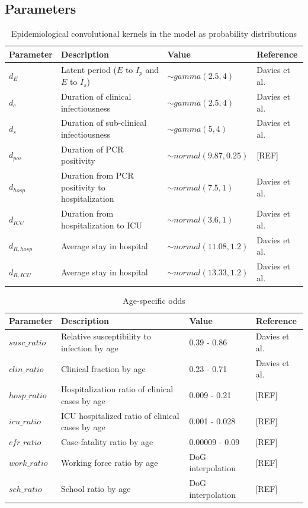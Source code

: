 \documentclass[12pt]{article}
\begin{document}
\newpage 
\subsection{Parameters}

\begin{center}
    \begin{table}[h]
    \caption{Epidemiological convolutional kernels in the model as probability distributions}
    \centering
\begin{tabular}[H]{p{2cm}p{6cm}p{4cm}p{3cm}}
     \textbf{Parameter}& \textbf{Description}  & \textbf{Value}& \textbf{Reference} \\
     \midrule
     $d_E$ & Latent period ($E$ to $I_p$ and $E$ to $I_s$) & $\sim gamma(2.5,4)$ & Davies et al.\\
     $d_c$ & Duration of clinical infectiousness& $\sim gamma(2.5,4)$ &  Davies et al.\\
     $d_s$ & Duration of sub-clinical infectiousness& $\sim gamma(5,4)$ &  Davies et al.\\
     $d_{pos}$ & Duration of PCR positivity& $\sim normal(9.87, 0.25)$ & [REF]\\ 
     $d_{hosp}$ & Duration from PCR positivity to hospitalization& $\sim normal(7.5, 1)$ & Davies et al.\\ 
     $d_{ICU}$ & Duration from hospitalization to ICU& $\sim normal(3.6, 1)$ & Davies et al.\\ 
     $d_{R,hosp}$ & Average stay in hospital & $\sim normal(11.08, 1.2)$ & Davies et al.\\ 
     $d_{R,ICU}$ & Average stay in hospital & $\sim normal(13.33, 1.2)$ & Davies et al.
    \end{tabular}
\end{table}
\end{center}

\begin{center}
    \begin{table}[h]
    \caption{Age-specific odds}
    \centering
\begin{tabular}[H]{p{3cm}p{5cm}p{4cm}p{3cm}}
     \textbf{Parameter}& \textbf{Description}  & \textbf{Value}& \textbf{Reference} \\
     \midrule
     $susc\_ratio$ & Relative susceptibility to infection by age & 0.39 - 0.86 & Davies et al.\\
     $clin\_ratio$ & Clinical fraction by age &  0.23 - 0.71  &  Davies et al.\\
     $hosp\_ratio$ & Hospitalization ratio of clinical cases by age & 0.009 - 0.21 &  [REF]\\
     $icu\_ratio$ & ICU hospitalized ratio of clinical cases by age & 0.001 - 0.028 &  [REF]\\
     $cfr\_ratio$ & Case-fatality ratio by age& 0.00009 - 0.09 &  [REF]\\
     $work\_ratio$ & Working force ratio by age& DoG interpolation &  [REF]\\
     $sch\_ratio$ & School ratio by age & DoG interpolation &  [REF]
    \end{tabular}
\end{table}
\end{center}
\end{document}
